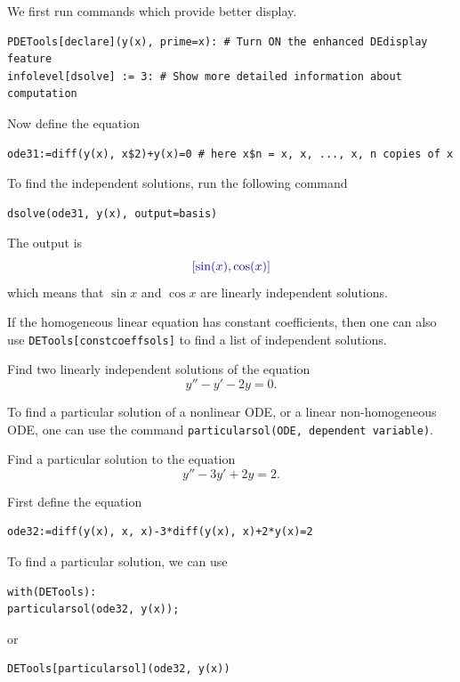 \documentclass[
  12pt]{elegantbook}
\begin{document}
\begin{solution}
We first run commands which provide better display.

\begin{verbatim}
PDETools[declare](y(x), prime=x): # Turn ON the enhanced DEdisplay feature
infolevel[dsolve] := 3: # Show more detailed information about computation
\end{verbatim}

Now define the equation

\begin{verbatim}
ode31:=diff(y(x), x$2)+y(x)=0 # here x$n = x, x, ..., x, n copies of x
\end{verbatim}

To find the independent solutions, run the following command

\begin{verbatim}
dsolve(ode31, y(x), output=basis)
\end{verbatim}

The output is
\[
  \color{blue}{[\sin(x), \cos(x)]}
\]
which means that \(\sin x\) and \(\cos x\) are linearly independent solutions.
\end{solution}

If the homogeneous linear equation has constant coefficients, then one can also use
\texttt{DETools{[}constcoeffsols{]}} to find a list of independent solutions.

\begin{exercise}
Find two linearly independent solutions of the equation
\[y'' - y' - 2y=0.\]
\end{exercise}

To find a particular solution of a nonlinear ODE, or a linear non-homogeneous ODE, one can use the command \texttt{particularsol(ODE,\ dependent\ variable)}.

\begin{example}
Find a particular solution to the equation
\[y''-3y'+2y=2.\]
\end{example}

\begin{solution}

First define the equation

\begin{verbatim}
ode32:=diff(y(x), x, x)-3*diff(y(x), x)+2*y(x)=2
\end{verbatim}

To find a particular solution, we can use

\begin{verbatim}
with(DETools):
particularsol(ode32, y(x));
\end{verbatim}

or

\begin{verbatim}
DETools[particularsol](ode32, y(x))
\end{verbatim}

\end{solution}
\end{document}
